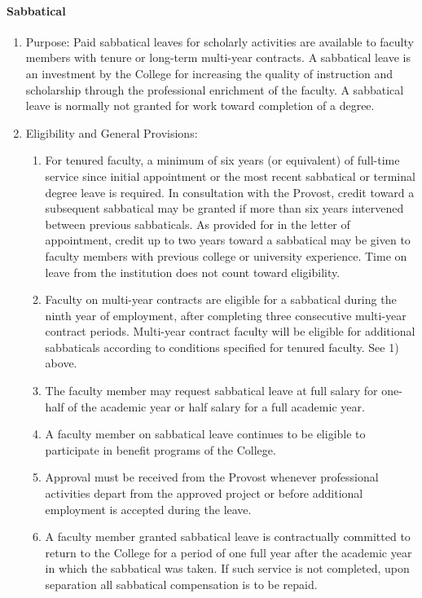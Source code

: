 \documentclass[letterpaper, 11pt]{article}
\begin{document}
			\paragraph{Sabbatical}
				\begin{enumerate}[label=\alph*)]
					\item{Purpose: Paid sabbatical leaves for scholarly activities are available to faculty members with tenure or long-term multi-year contracts.  A sabbatical leave is an investment by the College for increasing the quality of instruction and scholarship through the professional enrichment of the faculty.  A sabbatical leave is normally not granted for work toward completion of a degree.}
					\item{Eligibility and General Provisions:
						\begin{enumerate}[label=\arabic*)]
							\item{For tenured faculty, a minimum of six years (or equivalent) of full-time service since initial appointment or the most recent sabbatical or terminal degree leave is required.  In consultation with the Provost, credit toward a subsequent sabbatical may be granted if more than six years intervened between previous sabbaticals.  As provided for in the letter of appointment, credit up to two years toward a sabbatical may be given to faculty members with previous college or university experience.  Time on leave from the institution does not count toward eligibility.}
							\item{Faculty on multi-year contracts are eligible for a sabbatical during the ninth year of employment, after completing three consecutive multi-year contract periods.  Multi-year contract faculty will be eligible for additional sabbaticals according to conditions specified for tenured faculty.  See 1) above.}
							\item{The faculty member may request sabbatical leave at full salary for one-half of the academic year or half salary for a full academic year.}
							\item{A faculty member on sabbatical leave continues to be eligible to participate in benefit programs of the College.}
							\item{Approval must be received from the Provost whenever professional activities depart from the approved project or before additional employment is accepted during the leave.}
							\item{A faculty member granted sabbatical leave is contractually committed to return to the College for a period of one full year after the academic year in which the sabbatical was taken.  If such service is not completed, upon separation all sabbatical compensation is to be repaid.}

\end{enumerate}}
\end{enumerate}
\end{document}
